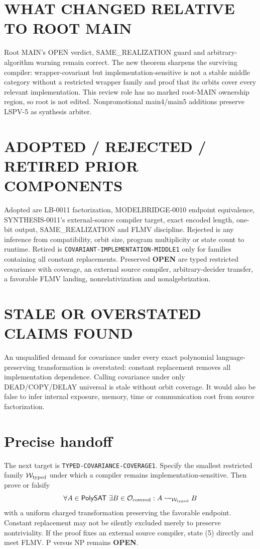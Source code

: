 \documentclass[11pt]{article}
\newcommand{\PolySAT}{\mathsf{PolySAT}}
\newcommand{\OPEN}{\textbf{OPEN}}
\begin{document}
\section{WHAT CHANGED RELATIVE TO ROOT MAIN}
Root MAIN's OPEN verdict, SAME\_REALIZATION guard and arbitrary-algorithm
warning remain correct. The new theorem sharpens the surviving compiler:
wrapper-covariant but implementation-sensitive is not a stable middle
category without a restricted wrapper family and proof that its orbits cover
every relevant implementation. This review role has no marked root-MAIN
ownership region, so root  is not edited. Nonpromotional
main4/main5 additions preserve LSPV-5 as synthesis arbiter.

\section{ADOPTED / REJECTED / RETIRED PRIOR COMPONENTS}
Adopted are LB-0011 factorization, MODELBRIDGE-0010 endpoint equivalence,
SYNTHESIS-0011's external-source compiler target, exact encoded length,
one-bit output, SAME\_REALIZATION and FLMV discipline. Rejected is any
inference from compatibility, orbit size, program multiplicity or state count
to runtime. Retired is \texttt{COVARIANT-IMPLEMENTATION-MIDDLE1} only for
families containing all constant replacements. Preserved \OPEN{} are typed
restricted covariance with coverage, an external source compiler,
arbitrary-decider transfer, a favorable FLMV landing, nonrelativization and
nonalgebrization.

\section{STALE OR OVERSTATED CLAIMS FOUND}
An unqualified demand for covariance under every exact polynomial
language-preserving transformation is overstated: constant replacement
removes all implementation dependence. Calling covariance under only
DEAD/COPY/DELAY universal is stale without orbit coverage. It would also be
false to infer internal exposure, memory, time or communication cost from
source factorization.

\section{Precise handoff}
The next target is \texttt{TYPED-COVARIANCE-COVERAGE1}. Specify the smallest
restricted family \(\mathcal W_{\rm typed}\) under which a compiler remains
implementation-sensitive. Then prove or falsify
\[
 \forall A\in\PolySAT\ \exists B\in\mathcal O_{\rm covered}:
 A\leadsto_{\mathcal W_{\rm typed}}B
\]
with a uniform charged transformation preserving the favorable endpoint.
Constant replacement may not be silently excluded merely to preserve
nontriviality. If the proof fixes an external source compiler, state (5)
directly and meet FLMV. P versus NP remains \OPEN.
\end{document}
